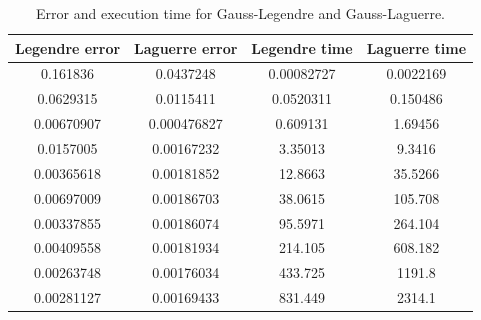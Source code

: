 \documentclass{article}
\begin{document}



  \begin{table}[ht] \label{tab:error-Gauss}
    \centering
      \caption{Error and execution time for Gauss-Legendre and Gauss-Laguerre.}
      \vspace{2mm}
      \begin{tabular}{|c|c|c|c|}
        \hline
        Legendre error & Laguerre error & Legendre time & Laguerre time   \\
        \hline \hline
        0.161836 & 0.0437248 & 0.00082727 & 0.0022169 \\
        0.0629315 & 0.0115411 & 0.0520311 & 0.150486 \\
        0.00670907 & 0.000476827 & 0.609131 & 1.69456 \\
        0.0157005 & 0.00167232 & 3.35013 & 9.3416 \\
        0.00365618 & 0.00181852 & 12.8663 & 35.5266 \\
        0.00697009 & 0.00186703 & 38.0615 & 105.708 \\
        0.00337855 & 0.00186074 & 95.5971 & 264.104 \\
        0.00409558 & 0.00181934 & 214.105 & 608.182 \\
        0.00263748 & 0.00176034 & 433.725 & 1191.8 \\
        0.00281127 & 0.00169433 & 831.449 & 2314.1 \\
        \hline
      \end{tabular} \\
      \hspace{0pt}\\
  \end{table}
\end{document}
